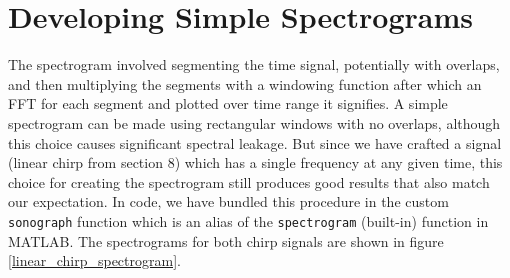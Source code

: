 \documentclass[10pt]{article}
\begin{document}
\section{Developing Simple Spectrograms}
The spectrogram involved segmenting the time signal, potentially with overlaps, and then multiplying the segments with a windowing function after which an FFT for each segment and plotted over time range it signifies. A simple spectrogram can be made using rectangular windows with no overlaps, although this choice causes significant spectral leakage. But since we have crafted a signal (linear chirp from section 8) which has a single frequency at any given time, this choice for creating the spectrogram still produces good results that also match our expectation. In code, we have bundled this procedure in the custom \texttt{sonograph} function which is an alias of the \texttt{spectrogram} (built-in) function in \textsc{MATLAB}. The spectrograms for both chirp signals are shown in figure \ref{linear_chirp_spectrogram}.
\end{document}

